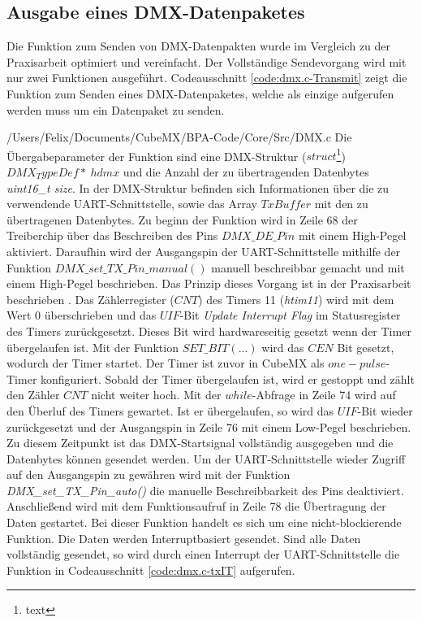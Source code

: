 \subsection{Ausgabe eines DMX-Datenpaketes}
Die Funktion zum Senden von DMX-Datenpakten wurde im Vergleich zu der Praxisarbeit optimiert und vereinfacht. Der Vollständige Sendevorgang wird mit nur zwei Funktionen ausgeführt. Codeausschnitt \ref{code:dmx.c-Transmit} zeigt die Funktion zum Senden eines DMX-Datenpaketes, welche als einzige aufgerufen werden muss um ein Datenpaket zu senden.

{/Users/Felix/Documents/CubeMX/BPA-Code/Core/Src/DMX.c}
Die Übergabeparameter der Funktion sind eine DMX-Struktur ($struct$\footnote{text}) $DMX_TypeDef*\ hdmx$ und die Anzahl der zu übertragenden Datenbytes \textit{uint16\_t size}. In der DMX-Struktur befinden sich Informationen über die zu verwendende UART-Schnittstelle, %
sowie das Array $TxBuffer$ mit den zu übertragenen Datenbytes. Zu beginn der Funktion wird in Zeile 68 der Treiberchip über das Beschreiben des Pins $DMX\_DE\_Pin$ mit einem High-Pegel aktiviert. Daraufhin wird der Ausgangspin der UART-Schnittstelle mithilfe der Funktion $DMX\_set\_TX\_Pin\_manual()$ manuell beschreibbar gemacht und mit einem High-Pegel beschrieben. Das Prinzip dieses Vorgang ist in der Praxisarbeit beschrieben \cite{Bauer2021}. %
Das Zählerregister ($CNT$) des Timers 11 (\textit{htim11}) wird mit dem Wert 0 überschrieben und das $UIF$-Bit \textit{Update Interrupt Flag} im Statusregister des Timers zurückgesetzt. Dieses Bit wird hardwareseitig gesetzt wenn der Timer übergelaufen ist. Mit der Funktion $SET\_BIT(...)$ wird das $CEN$ Bit gesetzt, wodurch der Timer startet. Der Timer ist zuvor in CubeMX als $one-pulse$-Timer%
konfiguriert. Sobald der Timer übergelaufen ist, wird er gestoppt und zählt den Zähler $CNT$ nicht weiter hoch. Mit der $while$-Abfrage in Zeile 74 wird auf den Überluf des Timers gewartet. Ist er übergelaufen, so wird das $UIF$-Bit wieder zurückgesetzt und der Ausgangspin in Zeile 76 mit einem Low-Pegel beschrieben. Zu diesem Zeitpunkt ist das DMX-Startsignal vollständig ausgegeben und die Datenbytes können gesendet werden. Um der UART-Schnittstelle wieder Zugriff auf den Ausgangspin zu gewähren wird mit der Funktion \textit{DMX\_set\_TX\_Pin\_auto()} die manuelle Beschreibbarkeit des Pins deaktiviert. Anschließend wird mit dem Funktionsaufruf in Zeile 78 die Übertragung der Daten gestartet. Bei dieser Funktion handelt es sich um eine nicht-blockierende Funktion. Die Daten werden Interruptbasiert gesendet. Sind alle Daten vollständig gesendet, so wird durch einen Interrupt der UART-Schnittstelle die Funktion in Codeausschnitt \ref{code:dmx.c-txIT} aufgerufen.

